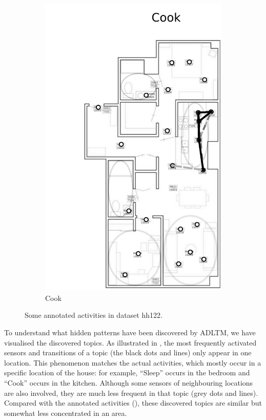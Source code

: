 \documentclass{article}
\begin{document}
\begin{figure}[!b]
\begin{subfigure}{0.32\linewidth}
    \includegraphics[width=\linewidth]{figures/visActs/Cook_bw_cp}
    \caption{Cook}
\end{subfigure}
\caption{Some annotated activities in dataset hh122.}
\label{fig:visacts}
\end{figure}

To understand what hidden patterns have been discovered by \ac{ADLTM}, we have visualised the discovered topics. As illustrated in ,  the most frequently activated sensors and transitions of a topic (the black dots and lines) only appear in one location. This phenomenon matches the actual activities, which mostly occur in a specific location of the house: for example, ``Sleep'' occurs in the bedroom and ``Cook'' occurs in the kitchen. Although some sensors of neighbouring locations are also involved, they are much less frequent in that topic (grey dots and lines).
%
Compared with the annotated activities (), these discovered topics are similar but somewhat less concentrated in an area. 
\end{document}
